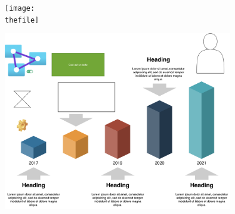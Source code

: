 \documentclass{article}
\begin{document}
\def\thefile{}

\thefile

\texttt{[image: \\thefile]}

\includegraphics[width=10cm]{pictures/mydiag.white.png}
\end{document}
